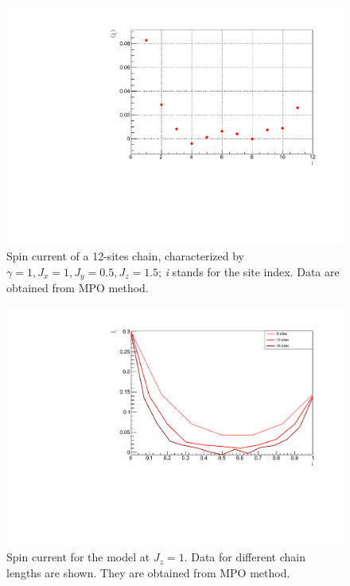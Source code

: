 \begin{figure}[H]
    \centering
    \includegraphics[scale=0.7]{Figures/12sites/SpinCurrL012m060Time002000_J10515.pdf}
    \caption{Spin current of a 12-sites chain, characterized by $\gamma=1, J_x=1, J_y=0.5, J_z=1.5$; \emph{i} stands for the site index. Data are obtained from MPO method.}
    \label{fig:my_label}
\end{figure}

\begin{figure}[H]
    \centering
    \includegraphics[scale=0.7]{Figures/NORM_SpinCurr_comparisonVSsize.pdf}
    \caption{Spin current for the model at $J_z = 1$. Data for different chain lengths are shown. They are obtained from MPO method.}
    \label{fig:my_label}
\end{figure}

